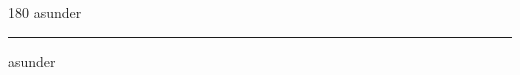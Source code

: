 
\begin{frame}
\begin{center}
\begin{turn}{180}
{\fontsize{2.5cm}{1em}\selectfont asunder}
\end{turn}
\vspace{1em}\par  
\hrule
\vspace{1em}\par  
{\fontsize{2.5cm}{1em}\selectfont asunder}
\end{center}
\end{frame}
